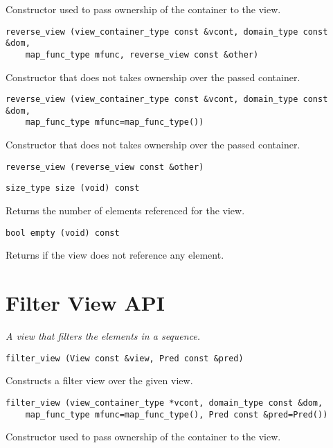 Constructor used to pass ownership of the container to the view.

\begin{verbatim}
reverse_view (view_container_type const &vcont, domain_type const &dom,
    map_func_type mfunc, reverse_view const &other)
\end{verbatim}

Constructor that does not takes ownership over the passed container.

\begin{verbatim}
reverse_view (view_container_type const &vcont, domain_type const &dom,
    map_func_type mfunc=map_func_type())
\end{verbatim}

Constructor that does not takes ownership over the passed container.

\begin{verbatim}
reverse_view (reverse_view const &other)
\end{verbatim}

\begin{verbatim}
size_type size (void) const
\end{verbatim}

Returns the number of elements referenced for the view.

\begin{verbatim}
bool empty (void) const
\end{verbatim}

Returns if the view does not reference any element.

\section{Filter View API } \label{sec-filt-vw}

\emph{ A view that filters the elements in a sequence.}

\begin{verbatim}
filter_view (View const &view, Pred const &pred)
\end{verbatim}

Constructs a filter view over the given view.

\begin{verbatim}
filter_view (view_container_type *vcont, domain_type const &dom,
    map_func_type mfunc=map_func_type(), Pred const &pred=Pred())
\end{verbatim}

Constructor used to pass ownership of the container to the view.

